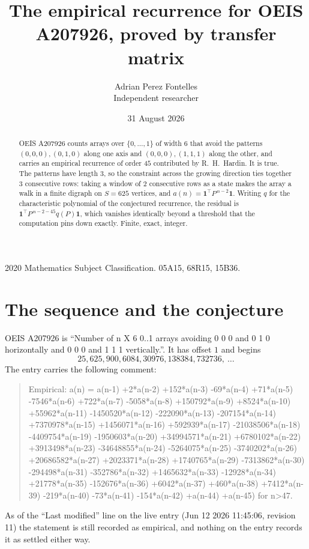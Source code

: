 \documentclass[11pt,a4paper]{article}
\title{The empirical recurrence for OEIS A207926, proved by transfer matrix}
\author{Adrian Perez Fontelles\\ \small Independent researcher}
\date{31 August 2026}
\theoremstyle{plain}
\theoremstyle{definition}
\begin{document}
\maketitle

\begin{abstract}
OEIS A207926 counts arrays over $\{0,\dots,1\}$ of width $6$ that avoid the patterns
$(0,0,0), (0,1,0)$ along one axis and $(0,0,0), (1,1,1)$ along the other, and carries an empirical recurrence of
order $45$ contributed by R.~H.~Hardin. It is true. The patterns have length $3$, so
the constraint across the growing direction ties together $3$ consecutive rows: taking a
window of $2$ consecutive rows as a state makes the array a walk in a finite digraph
on $S=625$ vertices, and $a(n)=\mathbf{1}^{\!\top}P^{\,n-2}\mathbf{1}$. Writing $q$
for the characteristic polynomial of the conjectured recurrence, the residual is
$\mathbf{1}^{\!\top}P^{\,n-2-45}q(P)\mathbf{1}$, which vanishes identically
beyond a threshold that the computation pins down exactly. Finite, exact, integer.
\end{abstract}

\noindent\small 2020 Mathematics Subject Classification. 05A15, 68R15, 15B36.\normalsize

\section{The sequence and the conjecture}

OEIS A207926 is ``Number of n X 6 0..1 arrays avoiding 0 0 0 and 0 1 0 horizontally and 0 0 0 and 1 1 1 vertically.''. It has offset
$1$ and begins
\[
25, 625, 900, 6084, 30976, 138384, 732736,\ \dots
\]
The entry carries the following comment:
\begin{quote}\small
Empirical: a(n) = a(n-1) +2*a(n-2) +152*a(n-3) -69*a(n-4) +71*a(n-5) -7546*a(n-6) +722*a(n-7) -5058*a(n-8) +150792*a(n-9) +8524*a(n-10) +55962*a(n-11) -1450520*a(n-12) -222090*a(n-13) -207154*a(n-14) +7370978*a(n-15) +1456071*a(n-16) +592939*a(n-17) -21038506*a(n-18) -4409754*a(n-19) -1950603*a(n-20) +34994571*a(n-21) +6780102*a(n-22) +3913498*a(n-23) -34648855*a(n-24) -5264075*a(n-25) -3740202*a(n-26) +20686582*a(n-27) +2023371*a(n-28) +1740765*a(n-29) -7313862*a(n-30) -294498*a(n-31) -352786*a(n-32) +1465632*a(n-33) -12928*a(n-34) +21778*a(n-35) -152676*a(n-36) +6042*a(n-37) +460*a(n-38) +7412*a(n-39) -219*a(n-40) -73*a(n-41) -154*a(n-42) +a(n-44) +a(n-45) for n>47.
\end{quote}
As of the ``Last modified'' line on the live entry (Jun 12 2026 11:45:06, revision
11) the statement is still recorded as empirical, and nothing on the entry
records it as settled either way.
\end{document}

